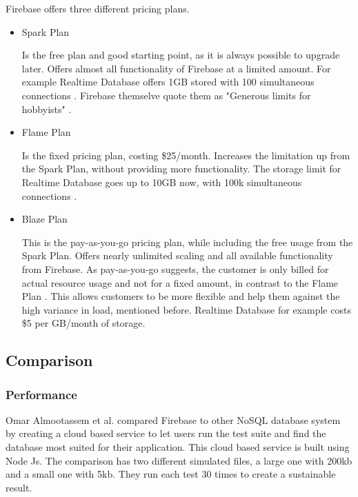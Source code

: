 Firebase offers three different pricing plans.
\begin{itemize}
    \item Spark Plan
    
    Is the free plan and good starting point, as it is always possible to upgrade later. Offers almost all functionality of Firebase at a limited amount. For example Realtime Database offers 1GB stored with 100 simultaneous connections \cite{FirebasePricing}. Firebase themselve quote them as "Generous limits for hobbyists" \cite{FirebasePricing}.
    
    \item Flame Plan
    
    Is the fixed pricing plan, costing \$25/month. Increases the limitation up from the Spark Plan, without providing more functionality. The storage limit for Realtime Database goes up to 10GB now, with 100k simultaneous connections \cite{FirebasePricing}.
    
    \item Blaze Plan
    
    This is the pay-as-you-go pricing plan, while including the free usage from the Spark Plan. Offers nearly unlimited scaling and all available functionality from Firebase. As pay-as-you-go suggests, the customer is only billed for actual resource usage and not for a fixed amount, in contrast to the Flame Plan \cite{FirebasePricing}. This allows customers to be more flexible and help them against the high variance in load, mentioned before. Realtime Database for example costs \$5 per GB/month of storage. 
\end{itemize}

\subsection{Comparison}
\subsubsection{Performance}
Omar Almootassem et al. \cite{almootassem2017cloud} compared Firebase to other NoSQL database system by creating a cloud based service to let users run the test suite and find the database most suited for their application. This cloud based service is built using Node Js. The comparison has two different simulated files, a large one with 200kb and a small one with 5kb. They run each test 30 times to create a sustainable result.

